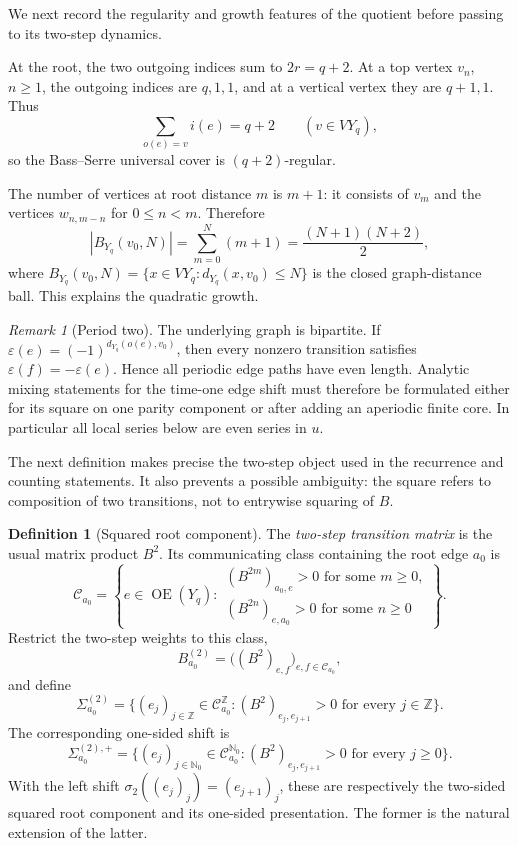\documentclass[11pt,reqno]{amsart}
\numberwithin{equation}{section}
\theoremstyle{definition}
\newtheorem{definition}[theorem]{Definition}
\theoremstyle{remark}
\newtheorem{remark}[theorem]{Remark}
\newcommand{\OrE}{\operatorname{OE}}
\newcommand{\cC}{\mathcal C}
\begin{document}
We next record the regularity and growth features of the quotient before
passing to its two-step dynamics.

At the root, the two outgoing indices sum to $2r=q+2$.  At a top vertex
$v_n$, $n\ge1$, the outgoing indices are $q,1,1$, and at a vertical vertex
they are $q+1,1$.  Thus
\begin{equation}\label{eq:degree}
 \sum_{o(e)=v}i(e)=q+2
 \qquad(v\in VY_q),
\end{equation}
so the Bass--Serre universal cover is $(q+2)$-regular.

The number of vertices at root distance $m$ is $m+1$: it consists of $v_m$
and the vertices $w_{n,m-n}$ for $0\le n<m$.  Therefore
\[
 |B_{Y_q}(v_0,N)|=\sum_{m=0}^N(m+1)
 =\frac{(N+1)(N+2)}2,
\]
where $B_{Y_q}(v_0,N)=\{x\in VY_q:d_{Y_q}(x,v_0)\le N\}$ is the closed
graph-distance ball.  This explains the quadratic growth.

\begin{remark}[Period two]\label{rem:periodtwo}
The underlying graph is bipartite.  If
$\varepsilon(e)=(-1)^{d_{Y_q}(o(e),v_0)}$, then every nonzero transition satisfies
$\varepsilon(f)=-\varepsilon(e)$.  Hence all periodic edge paths have even
length.  Analytic mixing statements for the time-one edge shift must therefore
be formulated either for its square on one parity component or after adding an
aperiodic finite core.  In particular all local series below are even series in
$u$.
\end{remark}

The next definition makes precise the two-step object used in the recurrence
and counting statements.  It also prevents a possible ambiguity: the square
refers to composition of two transitions, not to entrywise squaring of $B$.

\begin{definition}[Squared root component]
\label{def:squared-root-component}
The \emph{two-step transition matrix} is the usual matrix product $B^2$.
Its communicating class containing the root edge $a_0$ is
\[
 \cC_{a_0}=
 \left\{e\in\OrE(Y_q):
 \begin{array}{l}
 (B^{2m})_{a_0,e}>0\text{ for some }m\ge0,\\
 (B^{2n})_{e,a_0}>0\text{ for some }n\ge0
 \end{array}
 \right\}.
\]
Restrict the two-step weights to this class,
\[
 B^{(2)}_{a_0}
 =\bigl((B^2)_{e,f}\bigr)_{e,f\in\cC_{a_0}},
\]
and define
\[
 \Sigma^{(2)}_{a_0}
 =\bigl\{(e_j)_{j\in\mathbb Z}\in\cC_{a_0}^{\mathbb Z}:
 (B^2)_{e_j,e_{j+1}}>0\text{ for every }j\in\mathbb Z\bigr\}.
\]
The corresponding one-sided shift is
\[
 \Sigma^{(2),+}_{a_0}
 =\bigl\{(e_j)_{j\in\mathbb N_0}\in\cC_{a_0}^{\mathbb N_0}:
 (B^2)_{e_j,e_{j+1}}>0\text{ for every }j\ge0\bigr\}.
\]
With the left shift $\sigma_2((e_j)_j)=(e_{j+1})_j$, these are respectively
the two-sided squared root component and its one-sided presentation.  The
former is the natural extension of the latter.
\end{definition}
\end{document}
